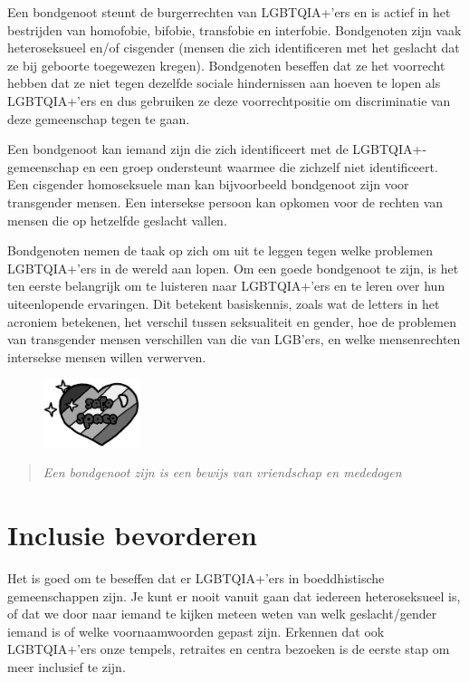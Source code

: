 \documentclass[12pt,openany]{book}
\begin{document}
Een  bondgenoot steunt de burgerrechten van LGBTQIA+’ers en is actief in het bestrijden van homofobie, bifobie, transfobie en interfobie. Bondgenoten zijn vaak heteroseksueel en/of cisgender (mensen die zich identificeren met het geslacht dat ze bij geboorte toegewezen kregen). Bondgenoten beseffen dat ze het voorrecht hebben dat ze niet tegen dezelfde sociale hindernissen aan hoeven te lopen als LGBTQIA+’ers en dus gebruiken ze deze voorrechtpositie om discriminatie van deze gemeenschap tegen te gaan. 

Een bondgenoot kan iemand zijn die zich identificeert met de LGBTQIA+-gemeenschap en een groep ondersteunt waarmee die zichzelf niet identificeert. Een cisgender homoseksuele man kan bijvoorbeeld bondgenoot zijn voor transgender mensen. Een intersekse persoon kan opkomen voor de rechten van mensen die op hetzelfde geslacht vallen.

Bondgenoten nemen de taak op zich om uit te leggen tegen welke problemen LGBTQIA+’ers in de wereld aan lopen. Om een goede bondgenoot te zijn, is het ten eerste belangrijk om te luisteren naar LGBTQIA+’ers en te leren over hun uiteenlopende ervaringen. Dit betekent basiskennis, zoals wat de letters in het acroniem betekenen, het verschil tussen seksualiteit en gender, hoe de problemen van transgender mensen verschillen van die van LGB’ers, en welke mensenrechten intersekse mensen willen verwerven.
\begin{figure}
    \centering
    \includegraphics[width=0.25\textwidth]{12bw.png}
\end{figure}

\begin{quote}
\textit{Een bondgenoot zijn is een bewijs van vriendschap en mededogen}
\end{quote}

\section*{Inclusie bevorderen}

Het is goed om te beseffen dat er LGBTQIA+’ers in boeddhistische gemeenschappen zijn. Je kunt er nooit vanuit gaan dat iedereen heteroseksueel is, of dat we door naar iemand te kijken meteen weten van welk geslacht/gender iemand is of welke voornaamwoorden gepast zijn. Erkennen dat ook LGBTQIA+’ers onze tempels, retraites en centra bezoeken is de eerste stap om meer inclusief te zijn.
\end{document}
